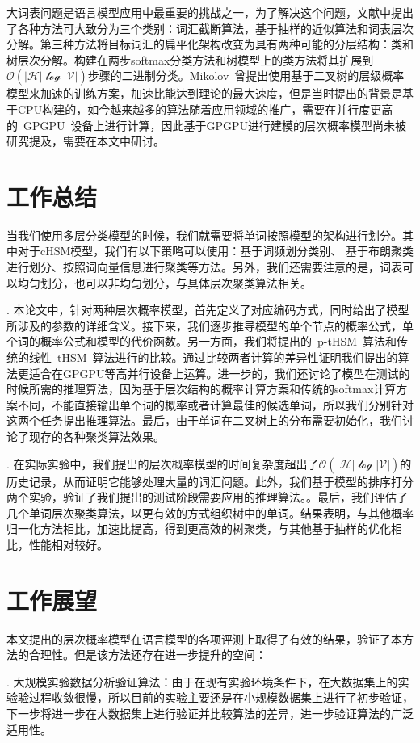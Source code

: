 \summary
大词表问题是语言模型应用中最重要的挑战之一，为了解决这个问题，文献中提出了各种方法可大致分为三个类别：词汇截断算法，基于抽样的近似算法和词表层次分解。第三种方法将目标词汇的扁平化架构改变为具有两种可能的分层结构：类和树层次分解。构建在两步softmax分类方法和树模型上的类方法将其扩展到$\mathcal {O(| H | \log | V |)} $步骤的二进制分类。Mikolov~曾提出使用基于二叉树的层级概率模型来加速的训练方案，加速比能达到理论的最大速度，但是当时提出的背景是基于CPU构建的，如今越来越多的算法随着应用领域的推广，需要在并行度更高的~GPGPU~设备上进行计算，因此基于GPGPU进行建模的层次概率模型尚未被研究提及，需要在本文中研讨。
\section*{工作总结}
当我们使用多层分类模型的时候，我们就需要将单词按照模型的架构进行划分。其中对于cHSM模型，我们有以下策略可以使用：基于词频划分类别、 基于布朗聚类进行划分、按照词向量信息进行聚类等方法。另外，我们还需要注意的是，词表可以均匀划分，也可以非均匀划分，与具体层次聚类算法相关。


. 本论文中，针对两种层次概率模型，首先定义了对应编码方式，同时给出了模型所涉及的参数的详细含义。接下来，我们逐步推导模型的单个节点的概率公式，单个词的概率公式和模型的代价函数。另一方面，我们将提出的~p-tHSM~算法和传统的线性~tHSM~算法进行的比较。通过比较两者计算的差异性证明我们提出的算法更适合在GPGPU等高并行设备上运算。进一步的，我们还讨论了模型在测试的时候所需的推理算法，因为基于层次结构的概率计算方案和传统的softmax计算方案不同，不能直接输出单个词的概率或者计算最佳的候选单词，所以我们分别针对这两个任务提出推理算法。最后，由于单词在二叉树上的分布需要初始化，我们讨论了现存的各种聚类算法效果。

. 在实际实验中，我们提出的层次概率模型的时间复杂度超出了$\mathcal{O(|H|\log|V|)}$的历史记录，从而证明它能够处理大量的词汇问题。此外，我们基于模型的排序打分两个实验，验证了我们提出的测试阶段需要应用的推理算法。。最后，我们评估了几个单词层次聚类算法，以更有效的方式组织树中的单词。结果表明，与其他概率归一化方法相比，加速比提高，得到更高效的树聚类，与其他基于抽样的优化相比，性能相对较好。

\section*{工作展望}
本文提出的层次概率模型在语言模型的各项评测上取得了有效的结果，验证了本方法的合理性。但是该方法还存在进一步提升的空间：

. 大规模实验数据分析验证算法：由于在现有实验环境条件下，在大数据集上的实验验过程收敛很慢，所以目前的实验主要还是在小规模数据集上进行了初步验证，下一步将进一步在大数据集上进行验证并比较算法的差异，进一步验证算法的广泛适用性。

